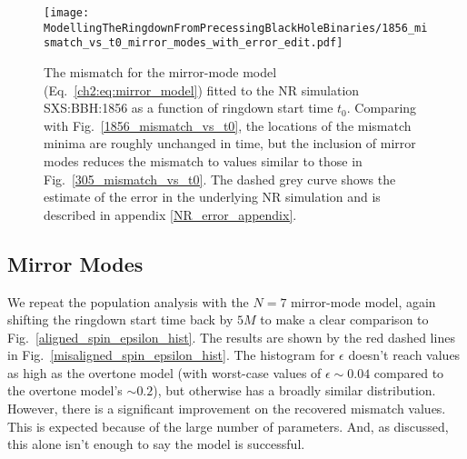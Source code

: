 
\begin{figure}[t]
    \centering
    \texttt{[image: ModellingTheRingdownFromPrecessingBlackHoleBinaries/1856\_mismatch\_vs\_t0\_mirror\_modes\_with\_error\_edit.pdf]}
    \caption[Mismatch as a function of ringdown start time for the mirror-mode model fitted to SXS:BBH:1856]{ 
    The mismatch for the mirror-mode model (Eq.~\ref{ch2:eq:mirror_model}) fitted to the NR simulation SXS:BBH:1856 as a function of ringdown start time $t_0$. Comparing with Fig.~\ref{1856_mismatch_vs_t0}, the locations of the mismatch minima are roughly unchanged in time, but the inclusion of mirror modes reduces the mismatch to values similar to those in Fig.~\ref{305_mismatch_vs_t0}. The dashed grey curve shows the estimate of the error in the underlying NR simulation and is described in appendix \ref{NR_error_appendix}.
    }
    \label{1856_mirror_mode_mismatch_vs_t0}
\end{figure}


\subsection{Mirror Modes} \label{subsec:misaligned_mirror_modes}

We repeat the population analysis with the $N=7$ mirror-mode model, again shifting the ringdown start time back by $5M$ to make a clear comparison to Fig.~\ref{aligned_spin_epsilon_hist}. 
The results are shown by the red dashed lines in Fig.~\ref{misaligned_spin_epsilon_hist}. The histogram for $\epsilon$ doesn't reach values as high as the overtone model (with worst-case values of $\epsilon \sim 0.04$ compared to the overtone model's $\sim 0.2$), but otherwise has a broadly similar distribution.
However, there is a significant improvement on the recovered mismatch values. This is expected because of the large number of parameters. And, as discussed, this alone isn't enough to say the model is successful.

